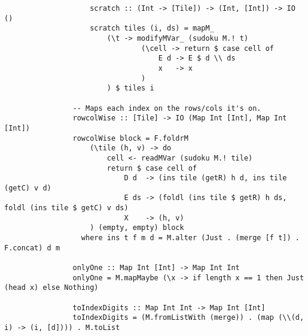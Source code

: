 \documentclass[a4paper,12pt]{article}
\begin{document}
\begin{section}
\begin{subsection}
\begin{subsubsection}
\begin{lstlisting}
                    scratch :: (Int -> [Tile]) -> (Int, [Int]) -> IO ()
                    scratch tiles (i, ds) = mapM_
                        (\t -> modifyMVar_ (sudoku M.! t)
                                (\cell -> return $ case cell of
                                    E d -> E $ d \\ ds
                                    x   -> x
                                )
                        ) $ tiles i
                
                -- Maps each index on the rows/cols it's on.
                rowcolWise :: [Tile] -> IO (Map Int [Int], Map Int [Int])
                rowcolWise block = F.foldrM
                    (\tile (h, v) -> do
                        cell <- readMVar (sudoku M.! tile)
                        return $ case cell of
                            D d  -> (ins tile (getR) h d, ins tile (getC) v d)
                            E ds -> (foldl (ins tile $ getR) h ds, foldl (ins tile $ getC) v ds)
                            X    -> (h, v)
                    ) (empty, empty) block
                  where ins t f m d = M.alter (Just . (merge [f t]) . F.concat) d m

                onlyOne :: Map Int [Int] -> Map Int Int
                onlyOne = M.mapMaybe (\x -> if length x == 1 then Just (head x) else Nothing)

                toIndexDigits :: Map Int Int -> Map Int [Int]
                toIndexDigits = (M.fromListWith (merge)) . (map (\\(d, i) -> (i, [d]))) . M.toList
            \end{lstlisting}

        \end{subsubsection}


    \end{subsection}

\end{section}
\end{document}
